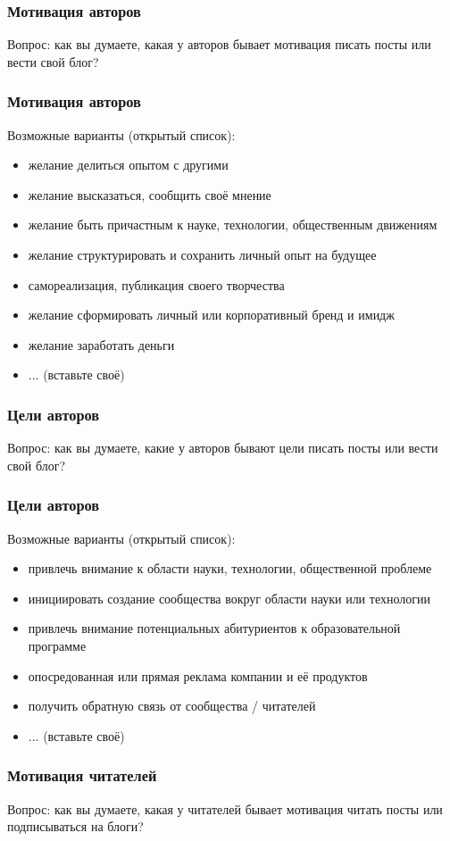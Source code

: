 \documentclass[14pt]{beamer}
\begin{document}
\begin{frame}
  \frametitle{Мотивация авторов}
  Вопрос: как вы думаете, какая у авторов бывает мотивация писать посты или вести свой блог?
\end{frame}

\begin{frame}
  \frametitle{Мотивация авторов}
  Возможные варианты (открытый список):
  \begin{itemize}
  \item желание делиться опытом с другими
  \item желание высказаться, сообщить своё мнение
  \item желание быть причастным к науке, технологии, общественным движениям
  \item желание структурировать и сохранить личный опыт на будущее
  \item самореализация, публикация своего творчества
  \item желание сформировать личный или корпоративный бренд и имидж
  \item желание заработать деньги
  \item ... (вставьте своё)
  \end{itemize}
\end{frame}

\begin{frame}
  \frametitle{Цели авторов}
  Вопрос: как вы думаете, какие у авторов бывают цели писать посты или вести свой блог?
\end{frame}

\begin{frame}
  \frametitle{Цели авторов}
  Возможные варианты (открытый список):
  \begin{itemize}
  \item привлечь внимание к области науки, технологии, общественной проблеме
  \item инициировать создание сообщества вокруг области науки или технологии
  \item привлечь внимание потенциальных абитуриентов к образовательной программе
  \item опосредованная или прямая реклама компании и её продуктов
  \item получить обратную связь от сообщества / читателей
  \item ... (вставьте своё)
  \end{itemize}
\end{frame}

\begin{frame}
  \frametitle{Мотивация читателей}
  Вопрос: как вы думаете, какая у читателей бывает мотивация читать посты
  или подписываться на блоги?
\end{frame}
\end{document}

